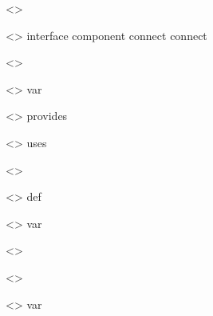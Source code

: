 \setlength{\grammarindent}{\grammaxindent}
\begin{obeliskgrammar}
<\compilationUNDERSCOREunit{}> \gramdef{} \gramstar{\topUNDERSCOREdeclaration*{}}
                                          \EOF*{}

<\topUNDERSCOREdeclaration{}> \gramdef{} interface \ID*{} \LCBRACK*{}
                                         \gramplus{\iUNDERSCOREmemberUNDERSCOREdeclaration*{}}
                                         \RCBRACK*{}
  \grambar component \ID*{} \gramopt{\provideUNDERSCOREclause*{}}
           \gramopt{\useUNDERSCOREclause*{}} \LCBRACK*{}
           \gramplus{\cUNDERSCOREmemberUNDERSCOREdeclaration*{}} \RCBRACK*{}
  \grambar connect \link*{}
  \grambar connect \LCBRACK*{} \gramstar{\link*{}} \RCBRACK*{}

<\link{}> \gramdef{} \ID*{} \DOT*{} \ID*{} \CONN*{} \ID*{} \DOT*{} \ID*{}
                     \SEMICOLON*{}

<\iUNDERSCOREmemberUNDERSCOREdeclaration{}> \gramdef{} var
                                                       \varUNDERSCOREsign*{}
                                                       \SEMICOLON*{}
  \grambar \funUNDERSCOREprototype*{} \SEMICOLON*{}

<\provideUNDERSCOREclause{}> \gramdef{} provides
                                        \gramsepnelist{\COMMA*{}}{\ID*{}}

<\useUNDERSCOREclause{}> \gramdef{} uses \gramsepnelist{\COMMA*{}}{\ID*{}}

<\varUNDERSCOREsign{}> \gramdef{} \ID*{} \TYPESIG*{} \typeUNDERSCORE*{}

<\funUNDERSCOREprototype{}> \gramdef{} def \ID*{} \LRBRACK*{}
                                       \gramseplist{\COMMA*{}}{\varUNDERSCOREsign*{}}
                                       \RRBRACK*{} \gramopt*{\TYPESIG*{}
                                       \basicUNDERSCOREtype*{}}

<\cUNDERSCOREmemberUNDERSCOREdeclaration{}> \gramdef{} var
                                                       \varUNDERSCOREsign*{}
                                                       \SEMICOLON*{}
  \grambar \funUNDERSCOREdeclaration*{}

<\funUNDERSCOREdeclaration{}> \gramdef{} \funUNDERSCOREprototype*{} \block*{}

<\block{}> \gramdef{} \LCBRACK*{} \gramstar{\blockUNDERSCOREcontent*{}}
                      \RCBRACK*{}

<\blockUNDERSCOREcontent{}> \gramdef{} \stmt*{}
  \grambar var \varUNDERSCOREsign*{} \SEMICOLON*{}


\end{obeliskgrammar}
